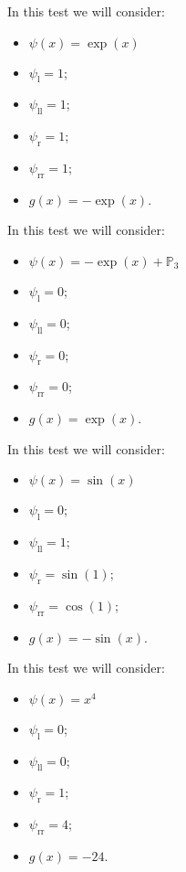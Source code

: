 \documentclass[12pt,a4paper]{article}
\author{Hélder Cruz}
\newcommand{\psil}{\psi_\text{l}}
\newcommand{\psill}{\psi_{\text{ll}}}
\newcommand{\psir}{\psi_\text{r}}
\newcommand{\psirr}{\psi_{\text{rr}}}
\begin{document}
In this test we will consider:
\begin{itemize}
\item $\psi(x)=\exp(x)$
\item $\psil=1$;
\item $\psill=1$;
\item $\psir=1$;
\item $\psirr=1$;
\item $g(x)=-\exp(x)$.
\end{itemize}


\pagebreak
In this test we will consider:
\begin{itemize}
\item $\psi(x)=-\exp(x)+\mathbb{P}_3$
\item $\psil=0$;
\item $\psill=0$;
\item $\psir=0$;
\item $\psirr=0$;
\item $g(x)=\exp(x)$.
\end{itemize}

\pagebreak
In this test we will consider:
\begin{itemize}
\item $\psi(x)=\sin(x)$
\item $\psil=0$;
\item $\psill=1$;
\item $\psir=\sin(1)$;
\item $\psirr=\cos(1)$;
\item $g(x)=-\sin(x)$.
\end{itemize}

\pagebreak
In this test we will consider:
\begin{itemize}
\item $\psi(x)=x^4$
\item $\psil=0$;
\item $\psill=0$;
\item $\psir=1$;
\item $\psirr=4$;
\item $g(x)=-24$.
\end{itemize}


\end{document}
